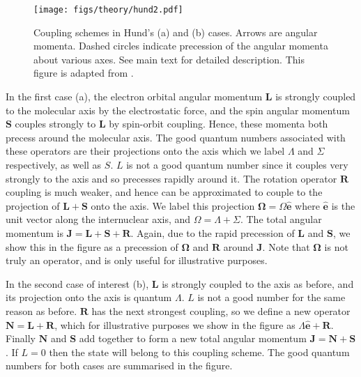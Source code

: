 \begin{figure}
  \centering
  \texttt{[image: figs/theory/hund2.pdf]}
  \caption[Hund's cases]{
    Coupling schemes in Hund's (a) and (b) cases. Arrows are angular
    momenta. Dashed circles indicate precession of the angular momenta about
    various axes. See main text for detailed description. This figure is
    adapted from .
  }
  \label{theory:fig:hund}
\end{figure}


In the first case (a), the electron orbital angular momentum $\mathbf{L}$ is
strongly coupled to the molecular axis by the electrostatic force, and the spin
angular momentum $\mathbf{S}$ couples strongly to $\mathbf{L}$ by spin-orbit
coupling. Hence, these momenta both precess around the molecular axis. The good
quantum numbers associated with these operators are their projections onto the
axis which we label $\Lambda$ and $\Sigma$  respectively, as well as $S$. $L$
is not a good quantum number since it couples very strongly to the axis and so
precesses rapidly around it.
%
The rotation operator $\mathbf{R}$ coupling is much weaker, and hence can be
approximated to couple to the projection of $\mathbf{L} + \mathbf{S}$ onto the
axis. We label this projection $\mathbf{\Omega} = \Omega \mathbf{\hat{e}}$
where $\mathbf{\hat{e}}$ is the unit vector along the internuclear axis, and $\Omega =
\Lambda + \Sigma$. The total angular momentum is $\mathbf{J} = \mathbf{L} +
\mathbf{S} + \mathbf{R}$. Again, due to the rapid precession of $\mathbf{L}$
and $\mathbf{S}$, we show this in the figure as a precession of
$\mathbf{\Omega}$ and $\mathbf{R}$ around $\mathbf{J}$. Note that
$\mathbf{\Omega}$ is not truly an operator, and is only useful for illustrative
purposes.

In the second case of interest (b), $\mathbf{L}$ is strongly coupled to the
axis as before, and its projection onto the axis is quantum $\Lambda$. $L$ is
not a good number for the same reason as before.  $\mathbf{R}$ has the next
strongest coupling, so we define a new operator $\mathbf{N} = \mathbf{L} +
\mathbf{R}$, which for illustrative purposes we show in the figure as $\Lambda
\mathbf{\hat{e}} + \mathbf{R}$. Finally $\mathbf{N}$ and $\mathbf{S}$ add
together to form a new total angular momentum $\mathbf{J} = \mathbf{N} +
\mathbf{S}$. If $L=0$ then the state will belong to this coupling scheme. The
good quantum numbers for both cases are summarised in the figure. 

